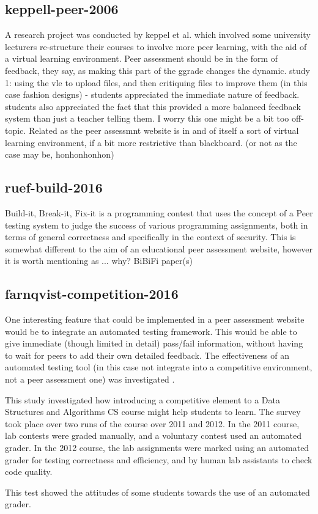 \documentclass[a4paper,11pt]{report}
\begin{document}
\subsection{keppell-peer-2006}
A research project was conducted by keppel et al.\cite{keppell_peer_2006} which involved some university lecturers re-structure their courses to involve more peer learning, with the aid of a virtual learning environment. 
Peer assessment should be in the form of feedback, they say, as making this part of the ggrade changes the dynamic.
study 1: using the vle to upload files, and then critiquing files to improve them (in this case fashion designs) - students appreciated the immediate nature of feedback. students also appreciated the fact that this provided a more balanced feedback system than just a teacher telling them. 
I worry this one might be a bit too off-topic.
Related as the peer assessmnt website is in and of itself a sort of virtual learning environment, if a bit more restrictive than blackboard. (or not as the case may be, honhonhonhon)


\subsection{ruef-build-2016}
Build-it, Break-it, Fix-it\cite{ruef_build_2016}\cite{ruef_build_2015} is a programming contest that uses the concept of a Peer testing system to judge the success of various programming assignments, both in terms of general correctness and specifically in the context of security. This is somewhat different to the aim of an educational peer assessment website, however it is worth mentioning as ... why?
BiBiFi paper(s)\par

\subsection{farnqvist-competition-2016}
One interesting feature that could be implemented in a peer assessment website would be to integrate an automated testing framework. This would be able to give immediate (though limited in detail) pass/fail information, without having to wait for peers to add their own detailed feedback. The effectiveness of an automated testing tool (in this case not integrate into a competitive environment, not a peer assessment one) was investigated \cite{farnqvist_competition_2016}.\par
This study investigated how introducing a competitive element to a Data Structures and Algorithms CS course might help students to learn. The survey took place over two runs of the course over 2011 and 2012. In the 2011 course, lab contests were graded manually, and a voluntary contest used an automated grader. In the 2012 course, the lab assignments were marked using an automated grader for testing correctness and efficiency, and by human lab assistants to check code quality.\par
This test showed the attitudes of some students towards the use of an automated grader.
\end{document}
